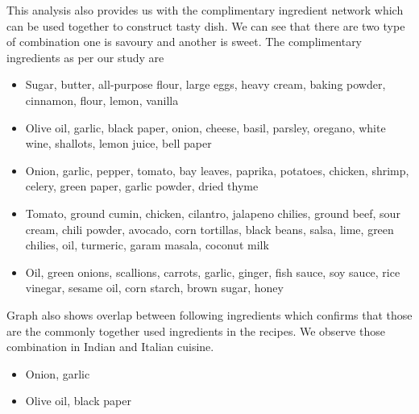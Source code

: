 \documentclass[sigconf]{acmart}
\begin{document}
This analysis also provides us with the complimentary ingredient network which can be used together to construct tasty dish. We can see that there are two type of combination one is savoury and another is sweet. The complimentary ingredients as per our study are
\begin{itemize}
\item Sugar, butter, all-purpose flour, large eggs, heavy cream, baking powder, cinnamon, flour, lemon, vanilla
\item Olive oil, garlic, black paper, onion, cheese, basil, parsley, oregano, white wine, shallots, lemon juice, bell paper
\item Onion, garlic, pepper, tomato, bay leaves, paprika, potatoes, chicken, shrimp, celery, green paper, garlic powder, dried thyme
\item Tomato, ground cumin, chicken, cilantro, jalapeno chilies, ground beef, sour cream, chili powder, avocado, corn tortillas, black beans, salsa, lime, green chilies, oil, turmeric, garam masala, coconut milk
\item Oil, green onions, scallions, carrots, garlic, ginger, fish sauce, soy sauce, rice vinegar, sesame oil, corn starch, brown sugar, honey
\end{itemize}

Graph also shows overlap between following ingredients which confirms that those are  the commonly together used ingredients in the recipes. We observe those combination in Indian and Italian cuisine. 
\begin{itemize}
\item Onion, garlic
\item Olive oil, black paper
\end{itemize}
\end{document}
